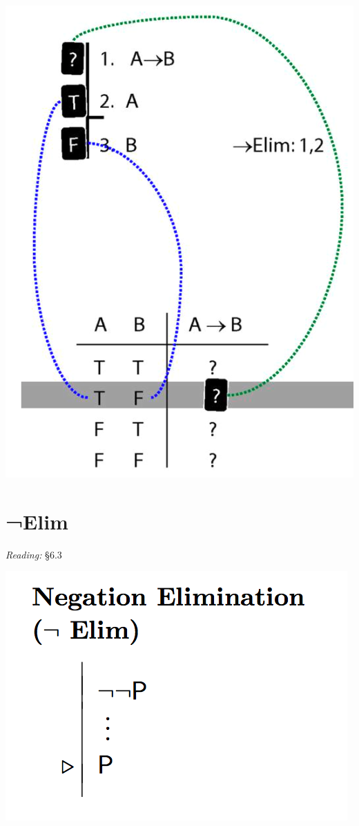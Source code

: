 \documentclass[12pt]{extarticle}
\begin{document}
\begin{multicols*}{3}
\begin{center}
\includegraphics[scale=0.3]{img/unit_700_rule_to_tt.png}
\end{center}
 
 
\section{¬Elim}
 
\emph{Reading:} §6.3
 
\begin{center}
\includegraphics[scale=0.3]{img/rule_negation_elim.png}
\end{center}
 

\end{multicols*}
\end{document}
